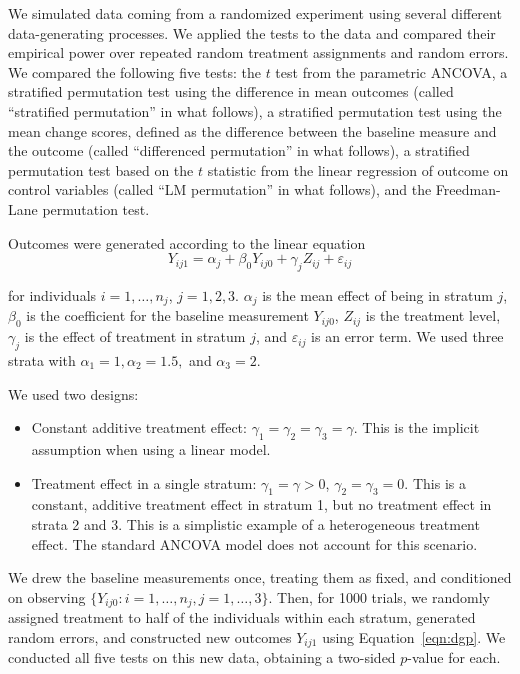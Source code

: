 \documentclass[11pt]{article}
\begin{document}
We simulated data coming from a randomized experiment using several different data-generating processes.
We applied the tests to the data and compared their empirical power over repeated random treatment assignments and random errors.
We compared the following five tests:
the $t$ test from the parametric ANCOVA,
a stratified permutation test using the difference in mean outcomes
 (called ``stratified permutation'' in what follows),
a stratified permutation test using the mean change scores, defined as the difference between the baseline measure and the outcome (called ``differenced permutation'' in what follows),
a stratified permutation test based on the $t$ statistic from the linear regression of outcome on control variables (called ``LM permutation'' in what follows),
and the Freedman-Lane permutation test.
 

Outcomes were generated according to the linear equation 
\begin{equation}\label{eqn:dgp}
Y_{ij1} =\alpha_j + \beta_0Y_{ij0} + \gamma_j Z_{ij} + \varepsilon_{ij}
\end{equation}

\noindent for individuals $i = 1, \dots, n_j$, $j = 1, 2, 3$.
$\alpha_j$ is the mean effect of being in stratum $j$, 
$\beta_0$ is the coefficient for the baseline measurement $Y_{ij0}$, 
$Z_{ij}$ is the treatment level, 
$\gamma_j$ is the effect of treatment in stratum $j$, 
and $\varepsilon_{ij}$ is an error term.
We used three strata with $\alpha_1 = 1, \alpha_2 = 1.5,$ and $\alpha_3 = 2$.

We used two designs:
\begin{itemize}
\item Constant additive treatment effect: $\gamma_1 = \gamma_2 = \gamma_3 = \gamma$. This is the implicit assumption when using a linear model.
\item Treatment effect in a single stratum: $\gamma_1 = \gamma > 0$, $\gamma_2 = \gamma_3 = 0$. This is a constant, additive treatment effect in stratum 1, but no treatment effect in strata 2 and 3. This is a simplistic example of a heterogeneous treatment effect. The standard ANCOVA model does not account for this scenario.
\end{itemize}

\noindent We drew the baseline measurements once, treating them as fixed, and conditioned on observing $\{ Y_{ij0} : {i = 1,\dots,n_j, j = 1,\dots, 3}\}$.
Then, for 1000 trials, we randomly assigned treatment to half of the individuals within each stratum, generated random errors, and constructed new outcomes $Y_{ij1}$ using Equation~\ref{eqn:dgp}.
We conducted all five tests on this new data, obtaining a two-sided $p$-value for each.
\end{document}
